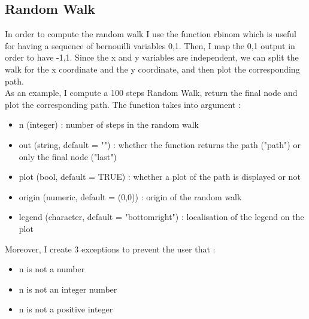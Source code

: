 \documentclass{llncs}\usepackage[]{graphicx}\usepackage[]{color}
\begin{document}
\subsection{Random Walk}
In order to compute the random walk I use the function rbinom which is useful for having a sequence of bernouilli variables 0,1. Then, I map the 0,1 output in order to have -1,1. Since the x and y variables are independent, we can split the walk for the x coordinate and the y coordinate, and then plot the corresponding path.\\
As an example, I compute a 100 steps Random Walk, return the final node and plot the corresponding path. The function takes into argument :
\begin{itemize}
\item n (integer) : number of steps in the random walk
\item out (string, default = "") : whether the function returns the path ("path") or only the final node ("last")
\item plot (bool, default = TRUE) : whether a plot of the path is displayed or not
\item origin (numeric, default = (0,0)) : origin of the random walk
\item legend (character, default = "bottomright") : localisation of the legend on the plot
\end{itemize}
Moreover, I create 3 exceptions to prevent the user that :
\begin{itemize}
\item n is not a number
\item n is not an integer number
\item n is not a positive integer
\end{itemize}
\end{document}
